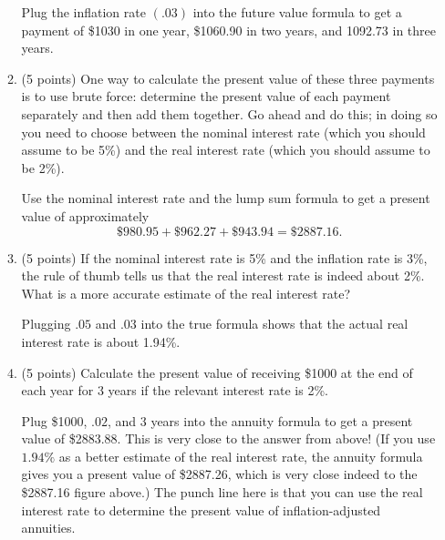 \documentclass[twoside]{article}
\begin{document}
\begin{enumerate}
\begin{enumerate}
\begin{KEY}
Plug the inflation rate $(.03)$ into the future value formula to get a payment of \$1030 in one year, \$1060.90 in two years, and 1092.73 in three years.
\end{KEY}

    \item \begin{EXAM} (5 points) One way to calculate the present value of these three payments is to use brute force:  determine the present value of each payment separately and then add them together. Go ahead and do this; in doing so you need to choose between the nominal interest rate (which you should assume to be 5\%) and the real interest rate (which you should assume to be 2\%). \clearpage \end{EXAM}

\begin{KEY}
Use the nominal interest rate and the lump sum formula to get a present value of approximately
\[ \$980.95 + \$962.27 + \$943.94 = \$2887.16. \]
\end{KEY}

    \item \begin{EXAM} (5 points) If the nominal interest rate is 5\% and the inflation rate is 3\%, the rule of thumb tells us that the real interest rate is indeed about 2\%. What is a more accurate estimate of the real interest rate? \vspace{2in} \end{EXAM}

\begin{KEY}
Plugging $.05$ and $.03$ into the true formula shows that the actual real interest rate is about 1.94\%.
\end{KEY}

    \item \begin{EXAM} (5 points) Calculate the present value of receiving \$1000 at the end of each year for 3 years if the relevant interest rate is 2\%. \vspace{2in} \end{EXAM}

\begin{KEY} Plug \$1000, $.02$, and 3 years into the annuity formula to get a present value of \$2883.88. This is very close to the answer from above! (If you use $1.94\%$ as a better estimate of the real interest rate, the annuity formula gives you a present value of \$2887.26, which is very close indeed to the \$2887.16 figure above.) The punch line here is that you can use the real interest rate to determine the present value of inflation-adjusted annuities.
\end{KEY}

    \end{enumerate}




\end{enumerate}
\end{document}
